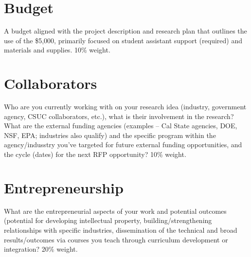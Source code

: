 \documentclass[letterpaper]{article}
\begin{document}
  \section{Budget}
  A budget aligned with the project description and research plan that outlines the use of the \$5,000, primarily focused on student assistant support (required) and materials and supplies. 10\% weight.

  \section{Collaborators}
  Who are you currently working with on your research idea (industry, government agency, CSUC collaborators, etc.), what is their involvement in the research? What are the external funding agencies (examples – Cal State agencies, DOE, NSF, EPA; industries also qualify) and the specific program within the agency/indusstry you’ve targeted for future external funding opportunities, and the cycle (dates) for the next RFP opportunity? 10\% weight.

  \section{Entrepreneurship}
  What are the entrepreneurial aspects of your work and potential outcomes (potential for developing intellectual property, building/strengthening relationships with specific industries, dissemination of the technical and broad results/outcomes via courses you teach through curriculum development or integration? 20\% weight.
\end{document}
